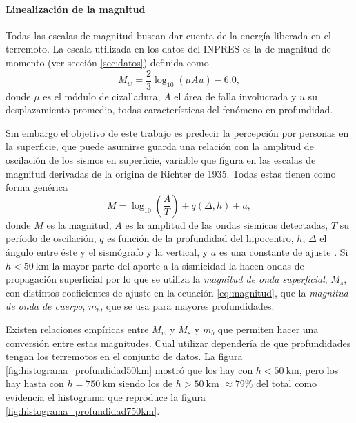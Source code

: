 \documentclass[a4paper]{report}
\begin{document}
\paragraph{Linealización de la magnitud}
Todas las escalas de magnitud buscan dar cuenta de la energía liberada en el terremoto.
La escala utilizada en los datos del INPRES es la de magnitud de momento (ver sección \ref{sec:datos}) definida como \cite[ec. 4.23]{fowler_solid_1990}
\begin{equation}
	M_w = \frac{2}{3} \log_{10} \left( \mu A u \right) - 6.0,
	\label{eq:momento}
\end{equation}
donde \(\mu\) es el módulo de cizalladura, \(A\) el área de falla involucrada y \(u\) su desplazamiento promedio, todas características del fenómeno en profundidad.

Sin embargo el objetivo de este trabajo es predecir la percepción por personas en la superficie, que puede asumirse guarda una relación con la amplitud de oscilación de los sismos en superficie, variable que figura en las escalas de magnitud derivadas de la origina de Richter de 1935.
Todas estas tienen como forma genérica
\begin{equation}
	M = \log_{10} \left( \frac{A}{T} \right) + q(\Delta, h) + a,
	\label{eq:magnitud}
\end{equation}
donde \(M\) es la magnitud, \(A\) es la amplitud de las ondas sismicas detectadas, \(T\) su período de oscilación, \(q\) es función de la profundidad del hipocentro, \(h\), \(\Delta\) el ángulo entre éste y el sismógrafo y la vertical, y \(a\) es una constante de ajuste \cite[ecuación 4.13]{fowler_solid_1990}.
Si \(h< \SI{50}{\kilo\metre}\) la mayor parte del aporte a la sismicidad la hacen ondas de propagación superficial por lo que se utiliza la \emph{magnitud de onda superficial}, \(M_s\), con distintos coeficientes de ajuste en la ecuación \ref{eq:magnitud}, que la \emph{magnitud de onda de cuerpo}, \(m_b\), que se usa para mayores profundidades.

Existen relaciones empíricas entre \(M_w\) y \(M_s\) y \(m_b\) que permiten hacer una conversión entre estas magnitudes.
Cual utilizar dependería de que profundidades tengan los terremotos en el conjunto de datos.
La figura \ref{fig:histograma_profundidad50km} mostró que los hay con \(h < \SI{50}{\kilo\metre}\), pero los hay hasta con \(h= \SI{750}{\kilo\metre}\) siendo los de \(h > \SI{50}{\kilo\metre}\) \(\approx 79\%\) del total como evidencia el histograma que reproduce la figura \ref{fig:histograma_profundidad750km}.
\end{document}
